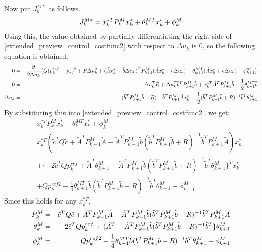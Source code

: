 Now put $J_k^{M\ast}$ as follows.
\begin{eqnarray}
  J_k^{M\ast} = x_k^{\ast T} P_k^M x_k^\ast + \theta_k^{MT} x_k^\ast + \phi_k^M \eqlabel{extended_preview_control_J}
\end{eqnarray}
Using this, the value obtained by partially differentiating the right side of \eqref{extended_preview_control_costfunc2} with respect to $\Delta u_k$ is 0, so the following equation is obtained.
\begin{eqnarray}
  0 = && \frac{\partial}{\partial \Delta u_k} \{ Q(p_k^{ref} - p_k)^2 + R\Delta u_k^2 + (\tilde{A} x^\ast_k + \tilde{b} \Delta u_k)^T P_{k+1}^M (\tilde{A} x^\ast_k + \tilde{b} \Delta u_k) + \theta_{k+1}^{MT} (\tilde{A} x^\ast_k + \tilde{b} \Delta u_k) + \phi_{k+1}^M \} \nonumber\\
  0 =&& \Delta u_k^T R + \Delta u_k^T \tilde{b}^T P_{k+1}^M \tilde{b} + x_k^{\ast T} \tilde{A}^T P_{k+1}^M \tilde{b} + \frac{1}{2} \theta_{k+1}^{MT} \tilde{b} \nonumber \\
  \Delta u_k =&& -(\tilde{b}^T P_{k+1}^M \tilde{b} + R )^{-1} \tilde{b}^T P_{k+1}^M \tilde{A} x_k^\ast - \frac{1}{2} (\tilde{b}^T P_{k+1}^M \tilde{b} + R )^{-1} \tilde{b}^T \theta_{k+1}^M\eqlabel{extended_preview_control_u}
\end{eqnarray}
By substituting this into \eqref{extended_preview_control_costfunc2}, we get:
\begin{eqnarray}
  && x_k^{\ast T} P_k^M x_k^\ast + \theta_k^{M T} x_k^\ast + \phi_k^M \nonumber \\
  =&& x_k^{\ast T} (\tilde{c}^T Q \tilde{c} + \tilde{A}^T P_{k+1}^M \tilde{A} - \tilde{A}^T P_{k+1}^M \tilde{b} (\tilde{b}^T P_{k+1}^M \tilde{b} + R )^{-1} \tilde{b}^T P_{k+1}^M \tilde{A}) x_k^\ast \nonumber\\
  && + \{-2 \tilde{c}^T Q p_k^{ref} + \tilde{A}^T \theta_{k+1}^M - \tilde{A}^T P_{k+1}^M \tilde{b} (\tilde{b}^T P_{k+1}^M \tilde{b} + R )^{-1} \tilde{b}^T \theta_{k+1}^M \}^T x_k^\ast \nonumber\\
  && + Q p_k^{ref 2} - \frac{1}{4} \theta_{k+1}^{MT} \tilde{b} (\tilde{b}^T P_{k+1}^M \tilde{b} + R )^{-1} \tilde{b}^T \theta_{k+1}^M + \phi_{k+1}^M
\end{eqnarray}
Since this holds for any $x_k^{\ast T}$,
\begin{eqnarray}
  P_k^M &=& \tilde{c}^T Q \tilde{c} + \tilde{A}^T P_{k+1}^M \tilde{A} - \tilde{A}^T P_{k+1}^M \tilde{b} (\tilde{b}^T P_{k+1}^M \tilde{b} + R )^{-1} \tilde{b}^T P_{k+1}^M \tilde{A} \eqlabel{extended_preview_control_P}\\
  \theta_k^M &=& -2 \tilde{c}^T Q p_k^{ref} + \{\tilde{A}^T - \tilde{A}^T P_{k+1}^M \tilde{b} (\tilde{b}^T P_{k+1}^M \tilde{b} + R )^{-1} \tilde{b}^T\} \theta_{k+1}^M \eqlabel{extended_preview_control_theta}\\
  \phi_k^M &=& Q p_k^{ref 2} - \frac{1}{4} \theta_{k+1}^{MT} \tilde{b} (\tilde{b}^T P_{k+1}^M \tilde{b} + R )^{-1} \tilde{b}^T \theta_{k+1}^M + \phi_{k+1}^M
\end{eqnarray}
